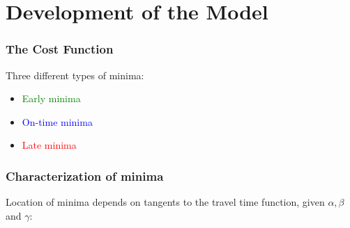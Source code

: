 \documentclass[hyperref={pdfpagelabels=false}]{beamer}
\begin{document}
\section{Development of the Model}

\begin{frame}
  \tableofcontents[currentsection]
\end{frame}

\begin{frame}
  \frametitle{The Cost Function}
  \begin{figure}
    \centering
  \end{figure}
  Three different types of minima:
  \begin{itemize}
  \item \textcolor{green}{Early minima}
  \item \textcolor{blue}{On-time minima}
  \item \textcolor{red}{Late minima}
  \end{itemize}
\end{frame}

\begin{frame}
  \frametitle{Characterization of minima}
  Location of minima depends on tangents to the travel time function, given \(\alpha, \beta\) and \(\gamma\):
  \begin{figure}
    \centering
  \end{figure}
\end{frame}
\end{document}

